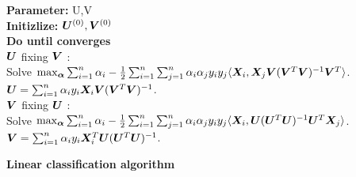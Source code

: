 \documentclass[12pt]{article}
\begin{document}
 \begin{algorithm}[h]
 \label{alg:linear}
{\bf Parameter:} U,V\\
{\bf Initizlize:} $\bm{U}^{(0)}, \bm{V}^{(0)}$\\
{\bf Do until converges}\\
\hspace*{.5cm}{\bf Update} $\bm{U}$ fixing $\bm{V}$ :\\[.1cm]
\hspace*{.4cm} Solve $ \max_{\bm\alpha}\sum_{i=1}^n\alpha_i-\frac{1}{2}\sum_{i=1}^n \sum_{j=1}^n\alpha_i\alpha_jy_iy_j\langle \bm X_i,\bm X_j\bm{V}(\bm{V}^T\bm{V})^{-1}\bm{V}^T\rangle$.\\
\hspace{.5cm} $\bm{U} = \sum_{i=1}^n\alpha_iy_i \bm X_i\bm{V}(\bm{V}^T\bm{V})^{-1}$.\\[.1cm]
\hspace*{.5cm}{\bf Update} $\bm{V}$ fixing $\bm{U}$ :\\[.1cm]
\hspace*{.4cm} Solve  $ \max_{\bm\alpha}\sum_{i=1}^n\alpha_i-\frac{1}{2}\sum_{i=1}^n\sum_{j=1}^n\alpha_i\alpha_jy_iy_j\langle \bm X_i,\bm{U}(\bm{U}^T\bm{U})^{-1}\bm{U}^T\bm X_j\rangle$.\\
\hspace{.5cm} $\bm{V} = \sum_{i=1}^n\alpha_iy_i \bm X_i^T\bm{U}(\bm{U}^T\bm{U})^{-1}$.\\[.1cm]
    \caption{{\bf Linear classification algorithm} }
\label{alg:smm}
\end{algorithm}
\end{document}
